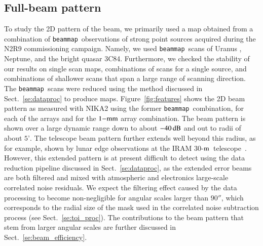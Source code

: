 \documentclass[traditionalabstract]{aa}
\newcommand{\bm}{{\tt beammap}}
\newcommand{\trentemetre}{30-$\rm{m}$}
\newcommand{\lp}[1]{#1}
\newcommand{\rev}[1]{#1}
\newcommand{\LEt}[1]{{\bf {\color[RGB]{0, 153, 255} #1}}}
\begin{document}
{\subsection{Full-beam pattern}
\label{se:fullbeam}

To study the 2D pattern of the beam, we 
primarily used %
a map obtained from a combination of \bm\ observations of strong point sources acquired during the N2R9 commissioning campaign.
Namely, we used \bm\ scans of Uranus%
,  Neptune, %
and the bright quasar 3C84. %
Furthermore, we checked the stability of our results on single scan
maps, combinations of scans for a single source, and combinations of
shallower scans that span a large range of scanning direction. {\lp
The \bm\ scans were reduced using the method discussed in
Sect.~\ref{se:dataproc} to produce maps.}
{\lp Figure~\ref{fig:features} shows the 2D beam pattern
as measured with NIKA2 using the former \bm\ combination, for each of
the arrays and for the $1\rm{-mm}$ array combination.}
{\lp The beam pattern is shown over a large dynamic range down
to about $-40\,\rm{dB}$ and out to radii of about $5’$.
The telescope beam pattern further extends well beyond this radius, as for
example, shown by lunar edge observations
at the IRAM \trentemetre\ telescope~\citep{Greve1998,
Kramer2013}. However,
this extended pattern is at present difficult to detect using the data
reduction pipeline discussed in Sect.~\ref{se:dataproc}, as
the extended error beams are both filtered and mixed with 
atmospheric and electronics large-scale correlated noise
residuals. {\rev We expect the filtering effect caused by the data
processing to become non-negligible for angular scales larger than
$90''$, which corresponds to the radial size of the mask used in the
correlated noise subtraction process (see Sect.~\ref{se:toi_proc}).}
The contributions to the beam pattern that stem from larger angular scales are
further discussed in Sect.~\ref{se:beam_efficiency}.} 

}
\end{document}

